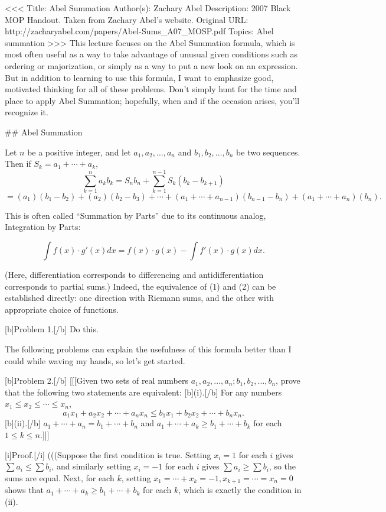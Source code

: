 <<<
Title: Abel Summation
Author(s): Zachary Abel
Description: 2007 Black MOP Handout. Taken from Zachary Abel's website. Original URL: http://zacharyabel.com/papers/Abel-Sums_A07_MOSP.pdf
Topics: Abel summation
>>>
This lecture focuses on the Abel Summation formula, which is most often useful as a way to take advantage
of unusual given conditions such as ordering or majorization, or simply as a way to put a new look on an
expression. But in addition to learning to use this formula, I want to emphasize good, motivated thinking
for all of these problems. Don’t simply hunt for the time and place to apply Abel Summation; hopefully,
when and if the occasion arises, you’ll recognize it.

## Abel Summation

Let $n$ be a positive integer, and let $a_1, a_2, \ldots, a_n$ and $b_1, b_2, \ldots, b_n$ be two sequences. Then if $S_k = a_1 + \cdots + a_k$, 
\[ \sum_{k=1}^n a_k b_k = S_n b_n + \sum_{k=1}^{n-1} S_k (b_k - b_{k+1}) \]
\[ = (a_1) (b_1 - b_2) + (a_2)(b_2 - b_3) + \cdots + (a_1 + \cdots + a_{n-1})(b_{n-1} - b_n) + (a_1 + \cdots + a_n)(b_n). \]

This is often called “Summation by Parts” due to its continuous analog, Integration by Parts:

\[ \int f(x) \cdot g'(x) dx = f(x) \cdot g(x) - \int f'(x) \cdot g(x) dx. \]

(Here, differentiation corresponds to differencing and antidifferentiation corresponds to partial sums.) Indeed, the equivalence of (1) and (2) can be established directly: one direction with Riemann sums, and the other with appropriate choice of functions.

[b]Problem 1.[/b] Do this. 

The following problems can explain the usefulness of this formula better than I could while waving my
hands, so let’s get started.

[b]Problem 2.[/b] [[[Given two sets of real numbers $a_1, a_2, \ldots, a_n; b_1, b_2, \ldots, b_n$, prove that the following two statements are equivalent:  
[b](i).[/b] For any numbers $x_1 \leq x_2 \leq \cdots \leq x_n$,  
\[ a_1 x_1 + a_2 x_2 + \cdots + a_n x_n \leq b_1 x_1 + b_2 x_2 + \cdots + b_n x_n. \]
[b](ii).[/b] $a_1 + \cdots + a_n = b_1 + \cdots + b_n$ and $a_1 + \cdots + a_k \geq b_1 + \cdots + b_k$ for each $1 \leq k \leq n$.]]]

[i]Proof.[/i] (((Suppose the first condition is true. Setting $x_i = 1$ for each $i$ gives $\sum a_i \leq \sum b_i$, and similarly setting $x_i = -1$ for each $i$ gives $\sum a_i \geq \sum b_i$, so the sums are equal. Next, for each $k$, setting $x_1 = \cdots + x_k = -1, x_{k+1} = \cdots = x_n = 0$ shows that $a_1 + \cdots + a_k \geq b_1 + \cdots + b_k$ for each $k$, which is exactly the condition in (ii). 

